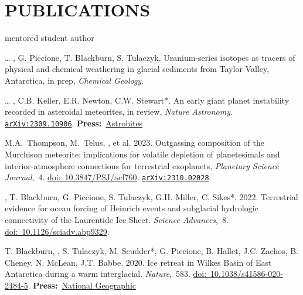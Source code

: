 \section*{PUBLICATIONS}
\hfill* mentored student author
\newcommand{\inprep}[1]{in prep, \textit{#1}}
\newcommand{\submitted}[1]{submitted, \textit{#1}}
\newcommand{\inreview}[1]{in review, \textit{#1}}
\newcommand{\inpress}[1]{in press, \textit{#1}}
\newcommand{\doi}[1]{\href{https://doi.org/#1}{doi:~#1}}
\newcommand{\arxiv}[1]{\href{https://arxiv.org/abs/#1}{\texttt{arXiv:#1}}}
\newcommand{\press}[2]{\textbf{Press:}~\href{#1}{#2}}
\newcommand{\pub}[2]{\textit{#1},~#2}

\begin{etaremune} [itemsep=4pt, leftmargin=3ex]
    \item[\dots] \ghedwards, G. Piccione, T. Blackburn,  S. Tulaczyk. Uranium-series isotopes as tracers of physical and chemical weathering in glacial sediments from Taylor Valley, Antarctica, \inprep{Chemical Geology}.
    \item[\dots] \ghedwards, C.B. Keller, E.R. Newton, C.W. Stewart*. An early giant planet instability recorded in asteroidal meteorites, \inreview{Nature Astronomy}. \arxiv{2309.10906}. \press{https://astrobites.org/2023/09/25/meteorites-planet-migration/}{Astrobites}
    \item M.A.~Thompson, M.~Telus, \ghedwards, et al. 2023. Outgassing composition of the Murchison meteorite: implications for volatile depletion of planetesimals and interior-atmosphere connections for terrestrial exoplanets, \pub{Planetary Science Journal}{4}. \doi{10.3847/PSJ/acf760}. \arxiv{2310.02028}.
    \item \ghedwards, T. Blackburn, G. Piccione, S. Tulaczyk, G.H. Miller, C. Sikes*. 2022. Terrestrial evidence for ocean forcing of Heinrich events and subglacial hydrologic connectivity of the Laurentide Ice Sheet. \pub{Science Advances}{8}. \doi{10.1126/sciadv.abp9329}.
    \item T. Blackburn, \ghedwards, S. Tulaczyk, M. Scudder*, G. Piccione, B. Hallet, J.C. Zachos, B. Cheney, N. McLean, J.T. Babbe. 2020. Ice retreat in Wilkes Basin of East Antarctica during a warm interglacial. \pub{Nature}{583}. \doi{10.1038/s41586-020-2484-5}. \press{https://www.nationalgeographic.com/science/2020/07/east-antarctic-ice-sheet-more-vulnerable-to-melting-than-thought/}{National Geographic}

\end{etaremune}
